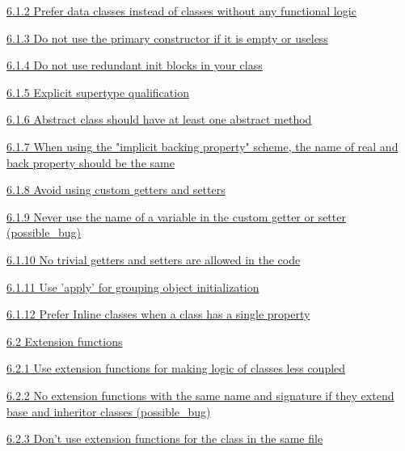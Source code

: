 \hspace{1.0cm}\hyperref[sec:6.1.2]{ 6.1.2 Prefer data classes instead of classes without any functional logic}

\hspace{1.0cm}\hyperref[sec:6.1.3]{ 6.1.3 Do not use the primary constructor if it is empty or useless}

\hspace{1.0cm}\hyperref[sec:6.1.4]{ 6.1.4 Do not use redundant init blocks in your class}

\hspace{1.0cm}\hyperref[sec:6.1.5]{ 6.1.5 Explicit supertype qualification}

\hspace{1.0cm}\hyperref[sec:6.1.6]{ 6.1.6 Abstract class should have at least one abstract method}

\hspace{1.0cm}\hyperref[sec:6.1.7]{ 6.1.7 When using the "implicit backing property" scheme, the name of real and back property should be the same}

\hspace{1.0cm}\hyperref[sec:6.1.8]{ 6.1.8 Avoid using custom getters and setters}

\hspace{1.0cm}\hyperref[sec:6.1.9]{ 6.1.9 Never use the name of a variable in the custom getter or setter (possible_bug)}

\hspace{1.0cm}\hyperref[sec:6.1.10]{ 6.1.10 No trivial getters and setters are allowed in the code}

\hspace{1.0cm}\hyperref[sec:6.1.11]{ 6.1.11 Use 'apply' for grouping object initialization}

\hspace{1.0cm}\hyperref[sec:6.1.12]{ 6.1.12 Prefer Inline classes when a class has a single property}

\hspace{0.5cm}\hyperref[sec:6.2]{ 6.2 Extension functions}

\hspace{1.0cm}\hyperref[sec:6.2.1]{ 6.2.1 Use extension functions for making logic of classes less coupled}

\hspace{1.0cm}\hyperref[sec:6.2.2]{ 6.2.2 No extension functions with the same name and signature if they extend base and inheritor classes (possible_bug)}

\hspace{1.0cm}\hyperref[sec:6.2.3]{ 6.2.3 Don't use extension functions for the class in the same file}

